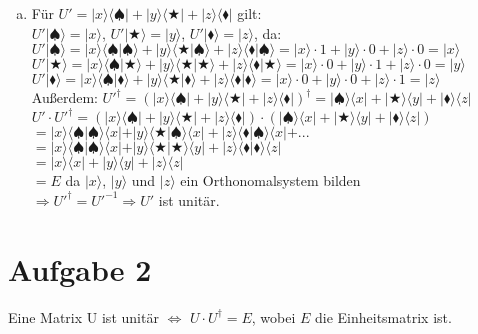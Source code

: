 \documentclass[a4paper]{scrartcl}
\begin{document}
\begin{enumerate}[a)]
\item Für $U'=|x\rangle\langle\spadesuit|+|y\rangle\langle\bigstar|+|z\rangle\langle\blacklozenge|$ gilt:\\
$U'|\spadesuit\rangle=|x\rangle$, $U'|\bigstar\rangle=|y\rangle$, $U'|\blacklozenge\rangle=|z\rangle$, da:\\
$U'|\spadesuit\rangle=|x\rangle\langle\spadesuit|\spadesuit\rangle+|y\rangle\langle\bigstar|\spadesuit\rangle+|z\rangle\langle\blacklozenge|\spadesuit\rangle = |x\rangle\cdot 1+|y\rangle\cdot 0+|z\rangle\cdot 0=|x\rangle$\\
$U'|\bigstar\rangle=|x\rangle\langle\spadesuit|\bigstar\rangle+|y\rangle\langle\bigstar|\bigstar\rangle+|z\rangle\langle\blacklozenge|\bigstar\rangle = |x\rangle\cdot 0+|y\rangle\cdot 1+|z\rangle\cdot 0=|y\rangle$\\
$U'|\blacklozenge\rangle=|x\rangle\langle\spadesuit|\blacklozenge\rangle+|y\rangle\langle\bigstar|\blacklozenge\rangle+|z\rangle\langle\blacklozenge|\blacklozenge\rangle = |x\rangle\cdot 0+|y\rangle\cdot 0+|z\rangle\cdot 1=|z\rangle$\\
Außerdem: $U'^{\dagger}=(|x\rangle\langle\spadesuit|+|y\rangle\langle\bigstar|+|z\rangle\langle\blacklozenge|)^{\dagger}=|\spadesuit\rangle\langle x|+|\bigstar\rangle\langle y|+|\blacklozenge\rangle\langle z|$\\
$U'\cdot U'^{\dagger}=(|x\rangle\langle\spadesuit|+|y\rangle\langle\bigstar|+|z\rangle\langle\blacklozenge|)\cdot(|\spadesuit\rangle\langle x|+|\bigstar\rangle\langle y|+|\blacklozenge\rangle\langle z|)$\\
$=|x\rangle\langle\spadesuit|\spadesuit\rangle\langle x|+|y\rangle\langle\bigstar|\spadesuit\rangle\langle x|+|z\rangle\langle\blacklozenge|\spadesuit\rangle\langle x|+...$\\
$=|x\rangle\langle\spadesuit|\spadesuit\rangle\langle x|+|y\rangle\langle\bigstar|\bigstar\rangle\langle y|+|z\rangle\langle\blacklozenge|\blacklozenge\rangle\langle z|$\\
$=|x\rangle\langle x|+|y\rangle\langle y|+|z\rangle\langle z|$\\
$=E$ da $|x\rangle$, $|y\rangle$ und $|z\rangle$ ein Orthonomalsystem bilden\\
$\Rightarrow U'^{\dagger} = U'^{-1} \Rightarrow U'$ ist unitär.


\end{enumerate}
\newpage
\section*{Aufgabe 2}
Eine Matrix U ist unitär $\Leftrightarrow$ $U\cdot U^{\dagger}=E$, wobei $E$ die Einheitsmatrix ist.\\\\
\end{document}
